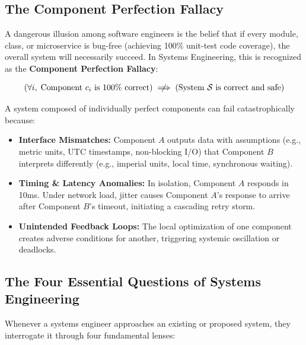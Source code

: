 \subsection{The Component Perfection Fallacy}
A dangerous illusion among software engineers is the belief that if every module, class, or microservice is bug-free (achieving 100\% unit-test code coverage), the overall system will necessarily succeed. In Systems Engineering, this is recognized as the \textbf{Component Perfection Fallacy}:

\begin{equation}
    \left( \forall i, \; \text{Component } c_i \text{ is 100\% correct} \right) \centernot\implies \left( \text{System } \mathcal{S} \text{ is correct and safe} \right)
\end{equation}

A system composed of individually perfect components can fail catastrophically because:
\begin{itemize}[leftmargin=1.5em]
    \item \textbf{Interface Mismatches:} Component $A$ outputs data with assumptions (e.g., metric units, UTC timestamps, non-blocking I/O) that Component $B$ interprets differently (e.g., imperial units, local time, synchronous waiting).
    \item \textbf{Timing \& Latency Anomalies:} In isolation, Component $A$ responds in 10ms. Under network load, jitter causes Component $A$'s response to arrive after Component $B$'s timeout, initiating a cascading retry storm.
    \item \textbf{Unintended Feedback Loops:} The local optimization of one component creates adverse conditions for another, triggering systemic oscillation or deadlocks.
\end{itemize}

\subsection{The Four Essential Questions of Systems Engineering}
Whenever a systems engineer approaches an existing or proposed system, they interrogate it through four fundamental lenses:

